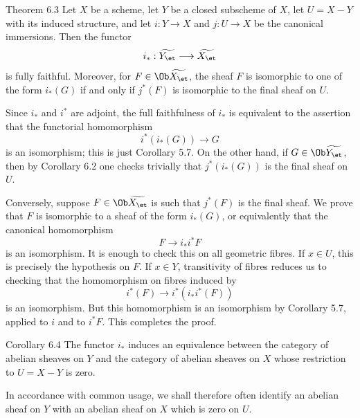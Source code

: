 \begin{statement}{Theorem 6.3}
Let \(X\) be a scheme, let \(Y\) be a closed subscheme of \(X\), let \(U=X-Y\) with its induced structure, and let \(i:Y\to X\) and \(j:U\to X\) be the canonical immersions. Then the functor
\[
i_*:\widetilde{Y_{\et}}\longrightarrow \widetilde{X_{\et}}
\]
is fully faithful. Moreover, for \(F\in\Ob\widetilde{X_{\et}}\), the sheaf \(F\) is isomorphic to one of the form \(i_*(G)\) if and only if \(j^*(F)\) is isomorphic to the final sheaf on \(U\).
\end{statement}

\begin{prooftext}
Since \(i_*\) and \(i^*\) are adjoint, the full faithfulness of \(i_*\) is equivalent to the assertion that the functorial homomorphism
\[
i^*(i_*(G))\longrightarrow G
\]
is an isomorphism; this is just Corollary 5.7. On the other hand, if \(G\in\Ob\widetilde{Y_{\et}}\), then by Corollary 6.2 one checks trivially that \(j^*(i_*(G))\) is the final sheaf on \(U\).

Conversely, suppose \(F\in\Ob\widetilde{X_{\et}}\) is such that \(j^*(F)\) is the final sheaf. We prove that \(F\) is isomorphic to a sheaf of the form \(i_*(G)\), or equivalently that the canonical homomorphism
\[
F\longrightarrow i_*i^*F
\]
is an isomorphism. It is enough to check this on all geometric fibres. If \(x\in U\), this is precisely the hypothesis on \(F\). If \(x\in Y\), transitivity of fibres reduces us to checking that the homomorphism on fibres induced by
\[
i^*(F)\longrightarrow i^*(i_*i^*(F))
\]
is an isomorphism. But this homomorphism is an isomorphism by Corollary 5.7, applied to \(i\) and to \(i^*F\). This completes the proof.
\end{prooftext}

\begin{statement}{Corollary 6.4}
The functor \(i_*\) induces an equivalence between the category of abelian sheaves on \(Y\) and the category of abelian sheaves on \(X\) whose restriction to \(U=X-Y\) is zero.
\end{statement}

In accordance with common usage, we shall therefore often identify an abelian sheaf on \(Y\) with an abelian sheaf on \(X\) which is zero on \(U\).

